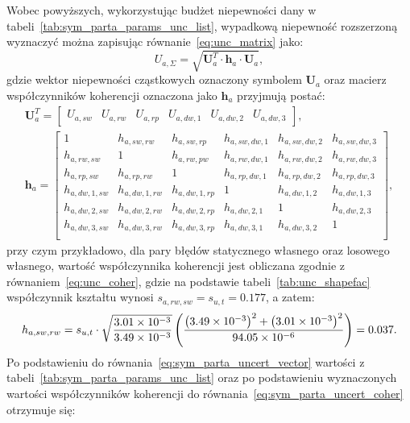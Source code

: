 Wobec powyższych, wykorzystując budżet niepewności dany w tabeli~\ref{tab:sym_parta_params_unc_list}, wypadkową niepewność rozszerzoną wyznaczyć można zapisując równanie~\eqref{eq:unc_matrix} jako:
\begin{equation}
U_{a,\Sigma} = \sqrt{\mathbf{U}_{a}^{T} \cdot \mathbf{h}_{a} \cdot \mathbf{U}_{a}} \label{eq:sym_parta_uncert_sum},
\end{equation}
gdzie wektor niepewności cząstkowych oznaczony symbolem $\mathbf{U}_{a}$ oraz macierz współczynników koherencji oznaczona jako $\mathbf{h}_{a}$ przyjmują postać:
\begin{gather}
\mathbf{U}_{a}^{T} =
\begin{bmatrix}
U_{a,sw} & U_{a,rw} & U_{a,rp} & U_{a,dw,1} & U_{a,dw,2} & U_{a,dw,3}
\end{bmatrix}
\label{eq:sym_parta_uncert_vector}, \\
\mathbf{h}_{a} =
\begin{bmatrix}
1             & h_{a,sw,rw}   & h_{a,sw,rp}   & h_{a,sw,dw,1} & h_{a,sw,dw,2} & h_{a,sw,dw,3} \\
h_{a,rw,sw}   & 1             & h_{a,rw,pw}   & h_{a,rw,dw,1} & h_{a,rw,dw,2} & h_{a,rw,dw,3} \\
h_{a,rp,sw}   & h_{a,rp,rw}   & 1             & h_{a,rp,dw,1} & h_{a,rp,dw,2} & h_{a,rp,dw,3} \\
h_{a,dw,1,sw} & h_{a,dw,1,rw} & h_{a,dw,1,rp} & 1             & h_{a,dw,1,2}  & h_{a,dw,1,3}  \\
h_{a,dw,2,sw} & h_{a,dw,2,rw} & h_{a,dw,2,rp} & h_{a,dw,2,1}  & 1             & h_{a,dw,2,3}  \\
h_{a,dw,3,sw} & h_{a,dw,3,rw} & h_{a,dw,3,rp} & h_{a,dw,3,1}  & h_{a,dw,3,2}  & 1             \\
\end{bmatrix}
\label{eq:sym_parta_uncert_coher},
\end{gather}
przy czym przykładowo, dla pary błędów statycznego własnego oraz losowego własnego, wartość współczynnika koherencji jest obliczana zgodnie z równaniem~\eqref{eq:unc_coher}, gdzie na podstawie tabeli~\ref{tab:unc_shapefac} współczynnik kształtu wynosi $s_{a,rw,sw} = s_{u,t} = 0.177$, a zatem:
\begin{equation}
h_{a,sw,rw} = s_{u,t} \cdot \sqrt{\frac{\num{3.01e-3}}{\num{3.49e-3}}} \left( \frac{\left(\num{3.49e-3}\right)^{2} + \left(\num{3.01e-3}\right)^{2}}{\num{94.05e-6}} \right) = 0.037 \label{eq:sym_parta_coher_sw_rw}.
\end{equation}
Po podstawieniu do równania~\eqref{eq:sym_parta_uncert_vector} wartości z tabeli~\ref{tab:sym_parta_params_unc_list} oraz po podstawieniu wyznaczonych wartości współczynników koherencji do równania~\eqref{eq:sym_parta_uncert_coher} otrzymuje się:
